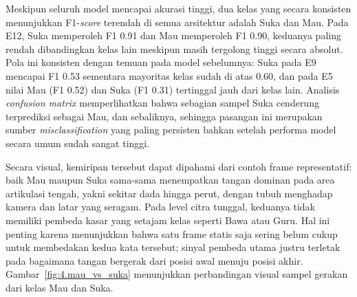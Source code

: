 Meskipun seluruh model mencapai akurasi tinggi, dua kelas yang secara konsisten menunjukkan F1-\textit{score} terendah di semua arsitektur adalah Suka dan Mau. Pada E12, Suka memperoleh F1 0.91 dan Mau memperoleh F1 0.90, keduanya paling rendah dibandingkan kelas lain meskipun masih tergolong tinggi secara absolut. Pola ini konsisten dengan temuan pada model sebelumnya: Suka pada E9 mencapai F1 0.53 sementara mayoritas kelas sudah di atas 0.60, dan pada E5 nilai Mau (F1 0.52) dan Suka (F1 0.31) tertinggal jauh dari kelas lain. Analisis \textit{confusion matrix} memperlihatkan bahwa sebagian sampel Suka cenderung terprediksi sebagai Mau, dan sebaliknya, sehingga pasangan ini merupakan sumber \textit{misclassification} yang paling persisten bahkan setelah performa model secara umum sudah sangat tinggi.\par

Secara visual, kemiripan tersebut dapat dipahami dari contoh frame representatif: baik Mau maupun Suka sama-sama menempatkan tangan dominan pada area artikulasi tengah, yakni sekitar dada hingga perut, dengan tubuh menghadap kamera dan latar yang seragam. Pada level citra tunggal, keduanya tidak memiliki pembeda kasar yang setajam kelas seperti Bawa atau Guru. Hal ini penting karena menunjukkan bahwa satu frame statis saja sering belum cukup untuk membedakan kedua kata tersebut; sinyal pembeda utama justru terletak pada bagaimana tangan bergerak dari posisi awal menuju posisi akhir. Gambar~\ref{fig:4.mau_vs_suka} menunjukkan perbandingan visual sampel gerakan dari kelas Mau dan Suka.\par

